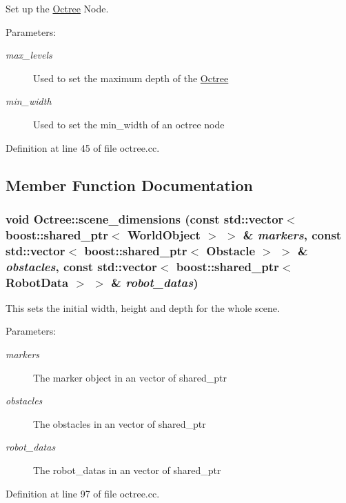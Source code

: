Set up the \hyperlink{class_octree}{Octree} Node. 

\begin{Desc}
\item[Parameters:]
\begin{description}
\item[{\em max\_\-levels}]Used to set the maximum depth of the \hyperlink{class_octree}{Octree} \item[{\em min\_\-width}]Used to set the min\_\-width of an octree node \end{description}
\end{Desc}


Definition at line 45 of file octree.cc.

\subsection{Member Function Documentation}
\hypertarget{class_octree_d09d7848f637b4322aa94f93217ef686}{
\subsubsection[scene\_\-dimensions]{\setlength{\rightskip}{0pt plus 5cm}void Octree::scene\_\-dimensions (const std::vector$<$ boost::shared\_\-ptr$<$ {\bf WorldObject} $>$ $>$ \& {\em markers}, \/  const std::vector$<$ boost::shared\_\-ptr$<$ Obstacle $>$ $>$ \& {\em obstacles}, \/  const std::vector$<$ boost::shared\_\-ptr$<$ {\bf RobotData} $>$ $>$ \& {\em robot\_\-datas})}}
\label{class_octree_d09d7848f637b4322aa94f93217ef686}


This sets the initial width, height and depth for the whole scene. 

\begin{Desc}
\item[Parameters:]
\begin{description}
\item[{\em markers}]The marker object in an vector of shared\_\-ptr \item[{\em obstacles}]The obstacles in an vector of shared\_\-ptr \item[{\em robot\_\-datas}]The robot\_\-datas in an vector of shared\_\-ptr \end{description}
\end{Desc}


Definition at line 97 of file octree.cc.


